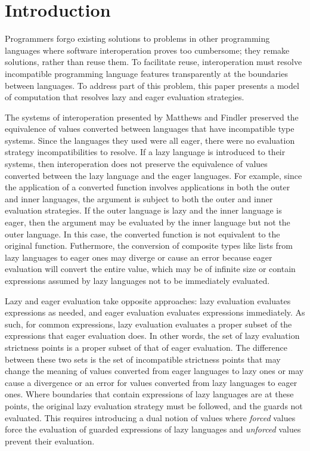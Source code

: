 \section{Introduction}

Programmers forgo existing solutions to problems in other programming languages where software interoperation proves too cumbersome; they remake solutions, rather than reuse them. To facilitate reuse, interoperation must resolve incompatible programming language features transparently at the boundaries between languages. To address part of this problem, this paper presents a model of computation that resolves lazy and eager evaluation strategies.

The systems of interoperation presented by Matthews and Findler \cite{matthews07} preserved the equivalence of values converted between languages that have incompatible type systems. Since the languages they used were all eager, there were no evaluation strategy incompatibilities to resolve. If a lazy language is introduced to their systems, then interoperation does not preserve the equivalence of values converted between the lazy language and the eager languages. For example, since the application of a converted function involves applications in both the outer and inner languages, the argument is subject to both the outer and inner evaluation strategies. If the outer language is lazy and the inner language is eager, then the argument may be evaluated by the inner language but not the outer language. In this case, the converted function is not equivalent to the original function. Futhermore, the conversion of composite types like lists from lazy languages to eager ones may diverge or cause an error because eager evaluation will convert the entire value, which may be of infinite size or contain expressions assumed by lazy languages not to be immediately evaluated.

Lazy and eager evaluation take opposite approaches: lazy evaluation evaluates expressions as needed, and eager evaluation evaluates expressions immediately. As such, for common expressions, lazy evaluation evaluates a proper subset of the expressions that eager evaluation does. In other words, the set of lazy evaluation strictness points is a proper subset of that of eager evaluation. The difference between these two sets is the set of incompatible strictness points that may change the meaning of values converted from eager languages to lazy ones or may cause a divergence or an error for values converted from lazy languages to eager ones. Where boundaries that contain expressions of lazy languages are at these points, the original lazy evaluation strategy must be followed, and the guards not evaluated. This requires introducing a dual notion of values where \emph{forced} values force the evaluation of guarded expressions of lazy languages and \emph{unforced} values prevent their evaluation.
